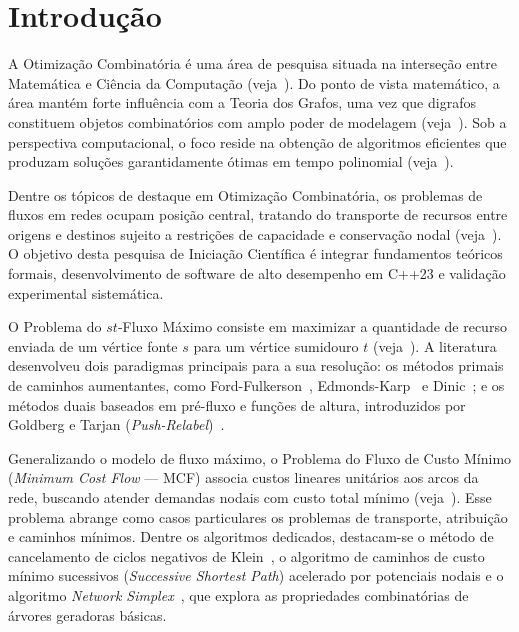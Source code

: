 \section{Introdução}\label{sec:introducao}

A Otimização Combinatória é uma área de pesquisa situada na interseção entre Matemática e Ciência da Computação (veja~\cite{korte2018combinatorial}). Do ponto de vista matemático, a área mantém forte influência com a Teoria dos Grafos, uma vez que digrafos constituem objetos combinatórios com amplo poder de modelagem (veja~\cite{bondy2008graph, diestel2017graph}). Sob a perspectiva computacional, o foco reside na obtenção de algoritmos eficientes que produzam soluções garantidamente ótimas em tempo polinomial (veja~\cite{cook1998combinatorial, schrijver2003combinatorial}).

Dentre os tópicos de destaque em Otimização Combinatória, os problemas de fluxos em redes ocupam posição central, tratando do transporte de recursos entre origens e destinos sujeito a restrições de capacidade e conservação nodal (veja~\cite{ahuja1993network}). O objetivo desta pesquisa de Iniciação Científica é integrar fundamentos teóricos formais, desenvolvimento de software de alto desempenho em C++23 e validação experimental sistemática.

O Problema do $st$-Fluxo Máximo consiste em maximizar a quantidade de recurso enviada de um vértice fonte $s$ para um vértice sumidouro $t$ (veja~\cite{ford1956maximal}). A literatura desenvolveu dois paradigmas principais para a sua resolução: os métodos primais de caminhos aumentantes, como Ford-Fulkerson~\cite{ford1956maximal}, Edmonds-Karp~\cite{edmonds1972theoretical} e Dinic~\cite{dinic1970algorithm}; e os métodos duais baseados em pré-fluxo e funções de altura, introduzidos por Goldberg e Tarjan (\textit{Push-Relabel})~\cite{goldberg1988new}.

Generalizando o modelo de fluxo máximo, o Problema do Fluxo de Custo Mínimo (\textit{Minimum Cost Flow} --- MCF) associa custos lineares unitários aos arcos da rede, buscando atender demandas nodais com custo total mínimo (veja~\cite{ahuja1993network}). Esse problema abrange como casos particulares os problemas de transporte, atribuição e caminhos mínimos. Dentre os algoritmos dedicados, destacam-se o método de cancelamento de ciclos negativos de Klein~\cite{klein1967primal}, o algoritmo de caminhos de custo mínimo sucessivos (\textit{Successive Shortest Path}) acelerado por potenciais nodais e o algoritmo \textit{Network Simplex}~\cite{dantzig1951application}, que explora as propriedades combinatórias de árvores geradoras básicas.

